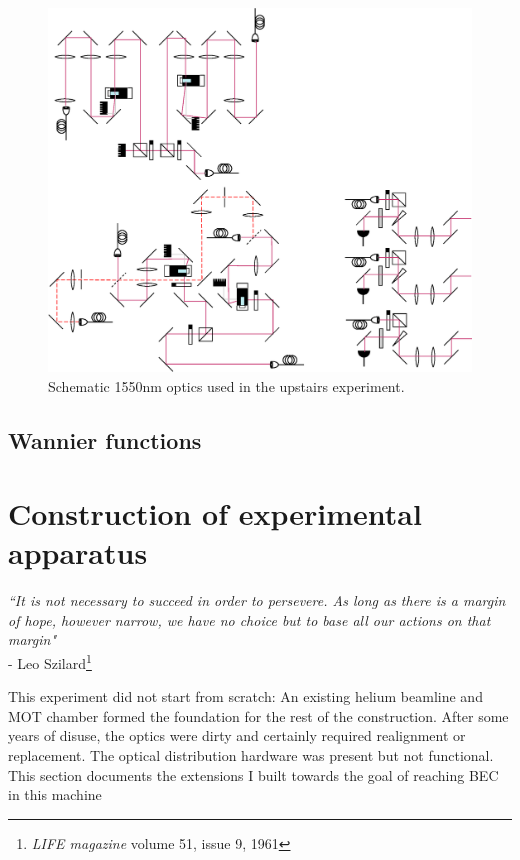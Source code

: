 	\begin{figure}[h]
	\centering
	\includegraphics[width=\textwidth]{fig/apparatus/dipole_optics}
	\caption{Schematic 1550nm optics used in the upstairs experiment.}
	\label{fig:dipole_optics}
	\end{figure}

\subsection{Wannier functions}


\section{Construction of experimental apparatus}

\begin{adjustwidth}{1cm}{0cm}
\begin{flushright}
\emph{``It is not necessary to succeed in order to persevere. As long as there is a margin of hope, however narrow, we have no choice but to base all our actions on that margin"}\\
- Leo Szilard\footnote{\emph{LIFE magazine} volume 51, issue 9, 1961 }\\
\end{flushright}
\end{adjustwidth}

This experiment did not start from scratch: An existing helium beamline and MOT chamber formed the foundation for the rest of the construction. After some years of disuse, the optics were dirty and certainly required realignment or replacement. The optical distribution hardware was present but not functional. This section documents the extensions I built towards the goal of reaching BEC in this machine

